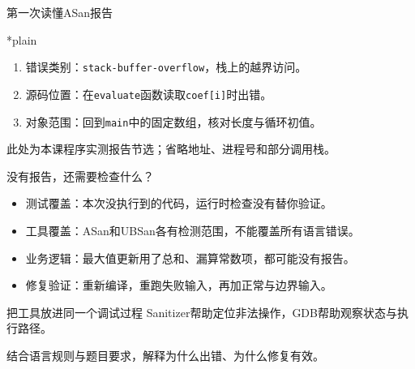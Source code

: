\begin{frame}{第一次读懂ASan报告}
    \begin{Code}*{plain}
        
    \end{Code}
    \begin{enumerate}
        \item \alert{错误类别}：\texttt{stack-buffer-overflow}，栈上的越界访问。
        \item \alert{源码位置}：在\texttt{evaluate}函数读取\texttt{coef[i]}时出错。
        \item \alert{对象范围}：回到\texttt{main}中的固定数组，核对长度与循环初值。
    \end{enumerate}
    \small 此处为本课程序实测报告节选；省略地址、进程号和部分调用栈。
\end{frame}



\begin{frame}{没有报告，还需要检查什么？}
    \begin{itemize}
        \item \alert{测试覆盖}：本次没执行到的代码，运行时检查没有替你验证。
        \item \alert{工具覆盖}：ASan和UBSan各有检测范围，不能覆盖所有语言错误。
        \item \alert{业务逻辑}：最大值更新用了总和、漏算常数项，都可能没有报告。
        \item \alert{修复验证}：重新编译，重跑失败输入，再加正常与边界输入。
    \end{itemize}
    \medskip
    \begin{vspquotered}{把工具放进同一个调试过程}
        Sanitizer帮助定位非法操作，GDB帮助观察状态与执行路径。\par
        结合语言规则与题目要求，解释为什么出错、为什么修复有效。
    \end{vspquotered}
\end{frame}
